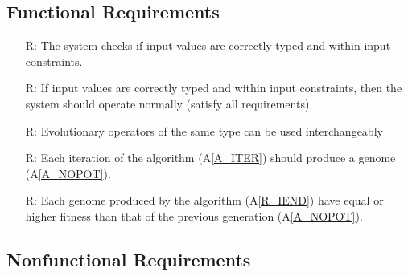 \documentclass[12pt]{article}
\newcommand{\aref}[1]{A\ref{#1}}
\newcounter{reqnum} %
\begin{document}
\subsection{Functional Requirements}
\label{subsubsec:freq}
\noindent \begin{itemize}
\item[R\refstepcounter{reqnum}\thereqnum \label{R_TYPECHECK}:] The system checks if input values are correctly typed and within input constraints.
\item[R\refstepcounter{reqnum}\thereqnum \label{R_TYPETHEN}:] If input values are correctly typed and within input constraints, then the system should operate normally (satisfy all requirements).

\item[R\refstepcounter{reqnum}\thereqnum \label{R_EVOCHANGE}:] Evolutionary operators of the same type can be used interchangeably 

\item[] \item[R\refstepcounter{reqnum}\thereqnum \label{R_IEND}:] Each iteration of the algorithm (\aref{A_ITER}) should produce a genome (\aref{A_NOPOT}).
\item[R\refstepcounter{reqnum}\thereqnum \label{R_IMBETTER}:] Each genome produced by the algorithm (\aref{R_IEND}) have equal or higher fitness than that of the previous generation (\aref{A_NOPOT}).

\end{itemize}

\subsection{Nonfunctional Requirements}
\label{subsubsec:nfreq}
\end{document}
